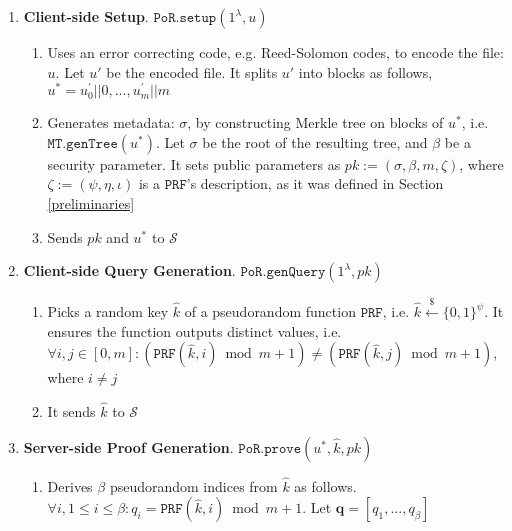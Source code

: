 \begin{enumerate}

\item\textbf{Client-side Setup}. $\mathtt{PoR.setup}(1^{\lambda},u)$  
\begin{enumerate}
\item Uses an error correcting code, e.g. Reed-Solomon codes, to encode  the file: $u$. Let $u'$ be the encoded file. It splits $u'$  into  blocks as follows, $u^{\scriptscriptstyle *}=u^{\scriptscriptstyle '}_{\scriptscriptstyle 0}||0,...,u^{\scriptscriptstyle '}_{\scriptscriptstyle m}||m$
\item Generates  metadata: $\sigma$, by constructing Merkle tree on blocks of $u^{\scriptscriptstyle *}$, i.e. $\mathtt{MT.genTree}(u^{\scriptscriptstyle *})$. Let $\sigma$ be the root of the resulting tree, and $\beta$ be a security parameter. It sets public  parameters as $pk:= (\sigma,\beta,m,\zeta)$, where $\zeta:=(\psi,\eta, \iota)$ is a $\mathtt{PRF}$'s description, as it was defined in Section \ref{preliminaries}
\item Sends $pk$ and $u^{\scriptscriptstyle *}$ to $\mathcal{S}$
\end{enumerate}

\item\textbf{Client-side Query Generation}. $\mathtt{PoR.genQuery}(1^{\scriptscriptstyle\lambda}, pk)$ 
\begin{enumerate}
\item\label{key-chalenge} Picks a random key $\hat{k}$ of a pseudorandom function $\mathtt{PRF}$, i.e. $\hat{k}\stackrel{\scriptscriptstyle\$}\leftarrow\{0,1\}^{\scriptscriptstyle\psi}$. It ensures the function outputs distinct values, i.e. $\forall i,j\in [0,m]: (\mathtt{PRF}(\hat{k},i)\bmod m+1)\neq(\mathtt{PRF}(\hat{k},j)\bmod m+1)$, where $i\neq j$

\item It sends $\hat{k}$ to $\mathcal{S}$
 
 \end{enumerate}
\item\label{PoR-server-prove}\textbf{Server-side Proof Generation}. $\mathtt{PoR.prove}(u^{\scriptscriptstyle *},\hat{k},pk)$ 
 \begin{enumerate}
\item Derives $\beta$ pseudorandom indices from $\hat{k}$ as follows. $\forall i,1\leq i\leq \beta: q_{\scriptscriptstyle i}=\mathtt{PRF}(\hat{k},i)\bmod m+1$. Let ${\bm{q}}=[q_{\scriptscriptstyle 1},..., q_{\scriptscriptstyle \beta}]$


\end{enumerate}
\end{enumerate}

